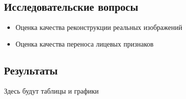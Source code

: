 \subsection{Исследовательские вопросы}
\begin{itemize}
\item Оценка качества реконструкции реальных изображений
\item Оценка качества переноса лицевых признаков
\end{itemize}


\subsection{Результаты}
Здесь будут таблицы и графики





